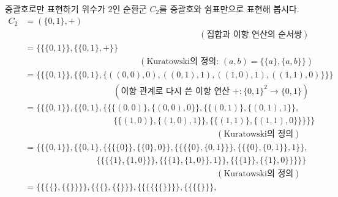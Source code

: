 \documentclass[serif]{beamer}
\begin{document}
\begin{frame}{중괄호로만 표현하기}
    위수가 $2$인 순환군 $C_2$를 중괄호와 쉼표만으로 표현해 봅시다.
    \[
        \begin{aligned}
            C_2&=(\{0,1\},+)\\
            &\phantom{=}\quad\quad\quad\quad\quad\quad\quad\quad\quad\quad\quad\quad\quad\quad\quad\quad\quad\quad\quad(\text{집합과 이항 연산의 순서쌍})\\
            &=\{ \{ \{0,1\} \}, \{ \{0,1\}, +\} \}\\
            &\phantom{=}\quad\quad\quad\quad\quad\quad\quad\quad\quad\quad\quad\quad(\text{Kuratowski의 정의: }(a,b)=\{ \{a\}, \{a,b\} \})\\
            &=\{ \{ \{0,1\} \}, \{ \{0,1\}, 
                \{
                    ((0,0),0), ((0,1),1), ((1,0),1), ((1,1),0)
                \}
            \} \}\\
            &\phantom{=}\quad\quad\quad\quad\quad\quad\quad\quad\quad(\text{이항 관계로 다시 쓴 이항 연산 }+:\{0,1\}^2\to\{0,1\})\\
            &=\{ \{ \{0,1\} \}, \{ \{0,1\}, 
                \{
                    \{ \{(0,0)\}, \{ (0,0), 0 \} \},
                    \{ \{(0,1)\}, \{ (0,1), 1 \} \},\\
            &\phantom{=}\quad\quad\quad\quad\quad\quad\quad\quad\quad
                    \{ \{(1,0)\}, \{ (1,0), 1 \} \},
                    \{ \{(1,1)\}, \{ (1,1), 0 \} \}
                \}
            \} \}\\
            &\phantom{=}\quad\quad\quad\quad\quad\quad\quad\quad\quad\quad\quad\quad\quad\quad\quad\quad\quad\quad\quad\quad\quad(\text{Kuratowski의 정의})\\
            &=\{ \{ \{0,1\} \}, \{ \{0,1\}, 
                \{
                    \{ \{ \{0\} \}, \{ \{0\}, 0 \} \},
                    \{ \{ \{ \{0\}, \{0,1\} \} \}, \{ \{ \{0\}, \{0,1\} \}, 1 \} \},\\
            &\phantom{=}\quad\quad\quad\quad\quad\quad\quad
                    \{ \{ \{ \{1\}, \{1,0\} \} \}, \{ \{ \{1\}, \{1,0\} \}, 1 \} \},
                    \{ \{ \{1\} \}, \{ \{1\}, 0 \} \}
                \}
            \} \}\\
            &\phantom{=}\quad\quad\quad\quad\quad\quad\quad\quad\quad\quad\quad\quad\quad\quad\quad\quad\quad\quad\quad\quad\quad(\text{Kuratowski의 정의})\\
            &=\{\{\{\{\},\{\{\}\}\}\},\{\{\{\},\{\{\}\}\},\{\{\{\{\{\{\}\}\}\},\{\{\{\{\}\}\},\\

\end{aligned}\]
\end{frame}
\end{document}
